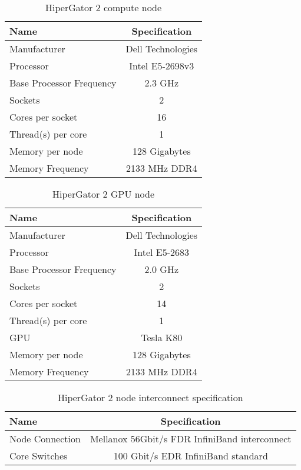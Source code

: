 \begin{table}[h]
  \centering
  \caption{HiperGator 2 compute node}
  \begin{tabular}{l c}
    \hline
    Name                       & Specification     \\
    \hline
    Manufacturer               & Dell Technologies \\
    Processor                  & Intel E5-2698v3   \\
    Base Processor Frequency   & 2.3 GHz           \\
    Sockets                    & 2                 \\
    Cores per socket           & 16                \\
    Thread(s) per core         & 1                 \\
    Memory per node            & 128 Gigabytes     \\
    Memory Frequency           & 2133 MHz DDR4     \\
    \hline
  \end{tabular}
  \label{tab:hpgcomputespecs}
\end{table}

\begin{table}[h]
  \centering
  \caption{HiperGator 2 GPU node}
  \begin{tabular}{l c}
    \hline
    Name                       & Specification     \\
    \hline
    Manufacturer               & Dell Technologies \\
    Processor                  & Intel E5-2683     \\
    Base Processor Frequency   & 2.0 GHz           \\
    Sockets                    & 2                 \\
    Cores per socket           & 14                \\
    Thread(s) per core         & 1                 \\
    GPU                        & Tesla K80         \\
    Memory per node            & 128 Gigabytes     \\
    Memory Frequency           & 2133 MHz DDR4     \\
    \hline
  \end{tabular}
  \label{tab:hpggpuspecs}
\end{table}

\begin{table}[h]
  \centering
  \caption{HiperGator 2 node interconnect specification}
  \begin{tabular}{l c}
    \hline
    Name             & Specification                                 \\
    \hline
    Node Connection  & Mellanox 56Gbit/s FDR InfiniBand interconnect \\
    Core Switches    & 100 Gbit/s EDR InfiniBand standard            \\
    \hline
  \end{tabular}
  \label{tab:hpgconnectspecs}
\end{table}

